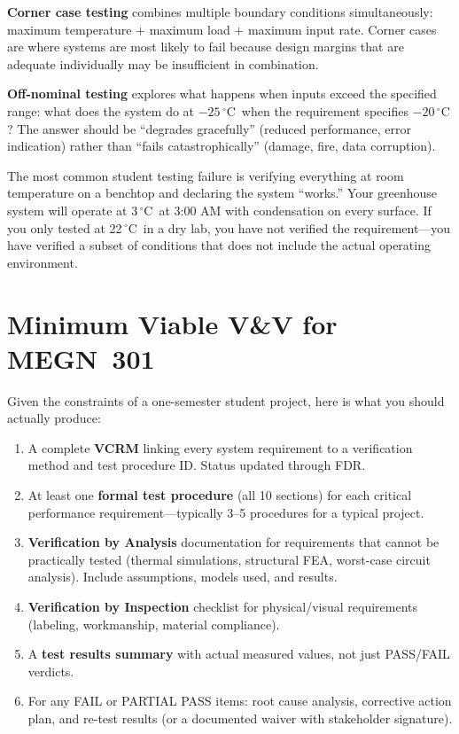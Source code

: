 \documentclass[11pt,letterpaper,twoside,openany]{book}
\newcommand{\degC}{\ensuremath{{}^{\circ}\text{C}}}
\begin{document}
\textbf{Corner case testing} combines multiple boundary conditions simultaneously: maximum temperature + maximum load + maximum input rate. Corner cases are where systems are most likely to fail because design margins that are adequate individually may be insufficient in combination.

\textbf{Off-nominal testing} explores what happens when inputs exceed the specified range: what does the system do at $-25$\,\degC\ when the requirement specifies $-20$\,\degC? The answer should be ``degrades gracefully'' (reduced performance, error indication) rather than ``fails catastrophically'' (damage, fire, data corruption).

\begin{warningbox}
The most common student testing failure is verifying everything at room temperature on a benchtop and declaring the system ``works.'' Your greenhouse system will operate at 3\,\degC\ at 3:00 AM with condensation on every surface. If you only tested at 22\,\degC\ in a dry lab, you have not verified the requirement---you have verified a subset of conditions that does not include the actual operating environment.
\end{warningbox}

\FloatBarrier
\section{Minimum Viable V\&V for MEGN~301}
Given the constraints of a one-semester student project, here is what you should actually produce:

\begin{enumerate}[leftmargin=1.5em]
\item A complete \textbf{VCRM} linking every system requirement to a verification method and test procedure ID. Status updated through FDR.
\item At least one \textbf{formal test procedure} (all 10 sections) for each critical performance requirement---typically 3--5 procedures for a typical project.
\item \textbf{Verification by Analysis} documentation for requirements that cannot be practically tested (thermal simulations, structural FEA, worst-case circuit analysis). Include assumptions, models used, and results.
\item \textbf{Verification by Inspection} checklist for physical/visual requirements (labeling, workmanship, material compliance).
\item A \textbf{test results summary} with actual measured values, not just PASS/FAIL verdicts.
\item For any FAIL or PARTIAL PASS items: root cause analysis, corrective action plan, and re-test results (or a documented waiver with stakeholder signature).
\end{enumerate}
\end{document}
